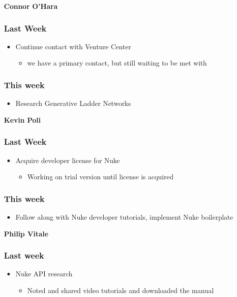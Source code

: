 \documentclass[11pt]{article}
\begin{document}
\textbf{Connor O’Hara}
\subsubsection{Last Week}
\label{sec:org5d1663a}
\begin{itemize}
\item Continue contact with Venture Center
\begin{itemize}
\item we have a primary contact, but still waiting to be met with
\end{itemize}
\end{itemize}
\subsubsection{This week}
\label{sec:org90d9eae}
\begin{itemize}
\item Research Generative Ladder Networks
\end{itemize}


\textbf{Kevin Poli}
\subsubsection{Last Week}
\label{sec:orgaa0c34c}
\begin{itemize}
\item Acquire developer license for Nuke
\begin{itemize}
\item Working on trial version until license is acquired
\end{itemize}
\end{itemize}
\subsubsection{This week}
\label{sec:orgb708ebc}
\begin{itemize}
\item Follow along with Nuke developer tutorials, implement Nuke boilerplate
\end{itemize}

\textbf{Philip Vitale}
\subsubsection{Last week}
\label{sec:org3c0adeb}
\begin{itemize}
\item Nuke API research
\begin{itemize}
\item Noted and shared video tutorials and downloaded the manual
\end{itemize}
\end{itemize}
\end{document}
